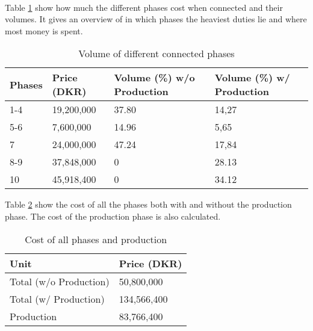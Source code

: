 ~\\

Table \ref{tab:VolumeOfPhases} show how much the different phases cost when connected and their volumes. It gives an overview of in which phases the heaviest duties lie and where most money is spent.

\begin{table}[H]
\centering
\begin{tabular}{|llll|}
\hline
\textbf{Phases} & \textbf{Price (DKR)} & \textbf{Volume (\%) w/o Production} & \textbf{Volume (\%) w/ Production}\\ \hline
1-4             & 19,200,000 & 37.80 & 14,27                                  \\
5-6             & 7,600,000 & 14.96 & 5,65                 \\
7               & 24,000,000 & 47.24 & 17,84                                  \\
8-9             & 37,848,000 & 0                  & 28.13                \\
10              & 45,918,400 & 0                  & 34.12                \\ \hline
\end{tabular}
\caption{Volume of different connected phases}
\label{tab:VolumeOfPhases}
\end{table}

Table \ref{tab:CostOfAllPhases} show the cost of all the phases both with and without the production phase. The cost of the production phase is also calculated.

\begin{table}[H]
\centering
\begin{tabular}{|l|l|}
\hline
\textbf{Unit}          & \textbf{Price (DKR)} \\ \hline
Total (w/o Production) & 50,800,000           \\
Total (w/ Production)  & 134,566,400          \\
Production             & 83,766,400           \\ \hline
\end{tabular}
\caption{Cost of all phases and production}
\label{tab:CostOfAllPhases}
\end{table}